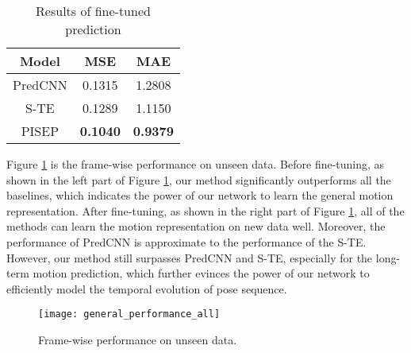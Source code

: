\documentclass[journal]{IEEEtran}
\begin{document}
\begin{table}[!t]
\renewcommand{\arraystretch}{1.3}
\caption{Results of fine-tuned prediction}
\label{table6}
\centering
\begin{tabular}{ccc}
\hline
Model&MSE&MAE \\
\hline
PredCNN\cite{predcnn}&0.1315&1.2808 \\
S-TE\cite{ButepageDRL}&0.1289&1.1150 \\
PISEP &{\bf 0.1040}&{\bf 0.9379} \\
\hline
\end{tabular}
\end{table}

Figure \ref{fig12} is the frame-wise performance on unseen data. Before fine-tuning, as shown in the left part of  Figure \ref{fig12}, our method significantly outperforms all the baselines, which indicates the power of our network to learn the general motion representation. After fine-tuning, as shown in the right part of Figure \ref{fig12}, all of the methods can learn the motion representation on new data well. Moreover, the performance of PredCNN is approximate to the performance of the S-TE. However, our method still surpasses PredCNN and S-TE, especially for the long-term motion prediction, which further evinces the power of our network to efficiently model the temporal evolution of pose sequence.

\begin{figure}[!t]
\centering
\texttt{[image: general\_performance\_all]}
\caption{Frame-wise performance on unseen data.}
\label{fig12}
\end{figure}
\end{document}
